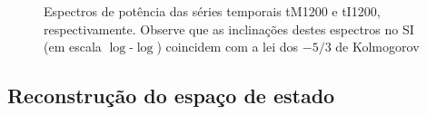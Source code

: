 \begin{figure}[ht]
\centering {}
\caption{Espectros de potência das séries temporais tM1200 e tI1200, respectivamente. Observe que as inclinações destes espectros no SI (em escala $\log$-$\log$) coincidem com a lei dos $-5/3$ de Kolmogorov}
\label{figespectrotMI0681200}
\end{figure}

\subsection{Reconstrução do espaço de estado}

